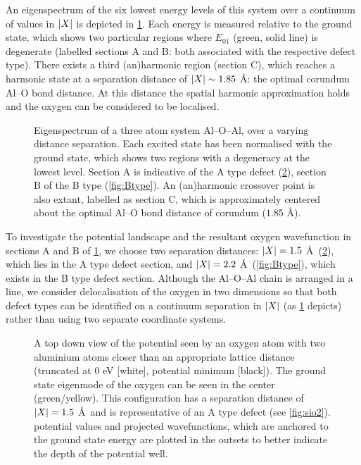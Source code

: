 An eigenspectrum of the six lowest energy levels of this system over a continuum of values in $\lvert X\rvert$  is depicted in \cref{fig:spectrum}.
Each energy is measured relative to the ground state, which shows two particular regions where $E_{01}$ (green, solid line) is degenerate (labelled sections A and B: both associated with the respective defect type).
There exists a third (an)harmonic region (section C), which reaches a harmonic state at a separation distance of $\lvert X\rvert \sim 1.85$ \AA: the optimal corundum Al--O bond distance.
At this distance the spatial harmonic approximation holds and the oxygen can be considered to be localised.

\begin{figure}[htp]
  \resizebox{0.9\textwidth}{!}{}
  \caption[Three Atom Eigenspectrum]{\label{fig:spectrum}Eigenspectrum of a three atom system Al--O--Al, over a varying distance separation. Each excited state has been normalised with the ground state, which shows two regions with a degeneracy at the lowest level. Section A is indicative of the A type defect (\cref{fig:Atype}), section B of the B type (\cref{fig:Btype}). An (an)harmonic crossover point is also extant, labelled as section C, which is approximately centered about the optimal Al--O bond distance of corundum ($1.85$ \AA).}
\end{figure}

To investigate the potential landscape and the resultant oxygen wavefunction in sections A and B of \cref{fig:spectrum}, we choose two separation distances: $\lvert X\rvert = 1.5$ \AA\ (\cref{fig:Atype}), which lies in the A type defect section, and $\lvert X\rvert = 2.2$ \AA\ (\cref{fig:Btype}), which exists in the B type defect section.
Although the Al--O--Al chain is arranged in a line, we consider delocalisation of the oxygen in two dimensions so that both defect types can be identified on a continuum separation in $\lvert X\rvert$ (as \cref{fig:spectrum} depicts) rather than using two separate coordinate systems.

\begin{figure}[htp]
\resizebox{\textwidth}{!}{}
\caption[A Type Ground State Wavefunction]{\label{fig:Atype}A top down view of the potential seen by an oxygen atom with two aluminium atoms closer than an appropriate lattice distance (truncated at $0$ eV [white], potential minimum [black]). The ground state eigenmode of the oxygen can be seen in the center (green/yellow). This configuration has a separation distance of $\lvert X\rvert = 1.5$ \AA\ and is representative of an A type defect (see \cref{fig:sio2}).  potential values and projected wavefunctions, which are anchored to the ground state energy  are plotted in the outsets to better indicate the depth of the potential well.}
\end{figure}

